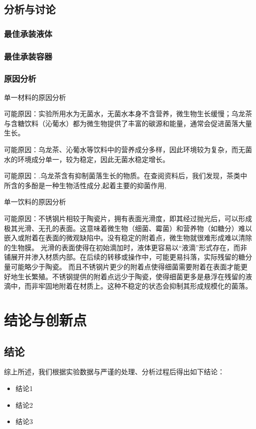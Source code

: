 \documentclass[12pt,a4paper]{ctexart}
\begin{document}
\subsection{分析与讨论}
\subsubsection{最佳承装液体}

\subsubsection{最佳承装容器}

\subsubsection{原因分析}
单一材料的原因分析

可能原因：实验所用水为无菌水，无菌水本身不含营养，微生物生长缓慢；乌龙茶与含糖饮料（沁葡水）都为微生物提供了丰富的碳源和能量，通常会促进菌落大量生长。

可能原因：乌龙茶、沁葡水等饮料中的营养成分多样，因此环境较为复杂，而无菌水的环境成分单一，较为稳定，因此无菌水稳定增长。

可能原因：.乌龙茶含有抑制菌落生长的物质。在查阅资料后，我们发现，茶类中所含的多酚是一种生物活性成分,起着主要的抑菌作用, \cite{HXSJ202002001}

单一饮料的原因分析

可能原因：不锈钢片相较于陶瓷片，拥有表面光滑度，即其经过抛光后，可以形成极其光滑、无孔的表面。这意味着微生物（细菌、霉菌）和营养物（如糖分）难以嵌入或附着在表面的微观缺陷中。没有稳定的附着点，微生物就很难形成难以清除的生物膜。
光滑的表面使得在初始滴加时，液体更容易以“液滴”形式存在，而非铺展开并渗入材质内部。在后续的转移或操作中，可能更易抖落，实际残留的糖分量可能略少于陶瓷。
而且不锈钢片更少的附着点使得细菌需要附着在表面才能更好地生长繁殖。不锈钢提供的附着点远少于陶瓷，使得细菌更多是悬浮在残留的液滴中，而非牢固地附着在材质上。这种不稳定的状态会抑制其形成规模化的菌落。



\section{结论与创新点}
\subsection{结论}
综上所述，我们根据实验数据与严谨的处理、分析过程后得出如下结论：
\begin{itemize}
    \item 结论1
    \item 结论2
    \item 结论3
\end{itemize}
\end{document}
